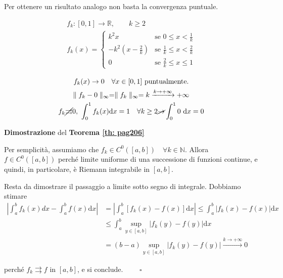 \begin{attbar}
	Per ottenere un risultato analogo non basta la convergenza puntuale.
\end{attbar}

\begin{gather*}
	f_k:[0,1]\rightarrow\mathbb{R}, \qquad k \geq 2
	\\
	f_k(x) = 
	\begin{cases}
		k^2x &\text{se } 0 \leq x < \frac{1}{k}
		\\
		-k^2 \left(x-\frac{2}{k}\right) & \text{se } \frac{1}{k} \leq x < \frac{2}{k}
		\\
		0 & \text{se } \frac{2}{k} \leq x \leq 1
	\end{cases}
\end{gather*}


\begin{gather*} 
	f_k(x) \rightarrow 0 \quad \forall x \in [0,1] \text{ puntualmente.}
	\\
	\parallel f_k-0 \parallel_\infty = \parallel f_k\parallel_\infty=k \xrightarrow{k \rightarrow +\infty} +\infty
	\\
	f_k \cancel{\rightrightarrows} 0, \ \int_{0}^{1} f_k(x) \mathrm{d}x = 1 \quad \forall k \geq 2 \cancel{\rightarrow} \int_{0}^{1} 0 \ \mathrm{d}x = 0
\end{gather*}


\begin{dembar}
	\textbf{Dimostrazione} del \textbf{Teorema \ref{th: pag206}}
	
	Per semplicità, assumiamo che $f_k \in C^0 ([a,b]) \quad \forall k \in \mathbb{N}$. Allora $f\in C^0 ([a,b])$ perché limite uniforme di una successione di funzioni continue, e quindi, in particolare, è Riemann integrabile in $[a,b]$.
	
	Resta da dimostrare il passaggio a limite sotto segno di integrale. Dobbiamo stimare 
	\begin{align*}
		\left| \int_{a}^{b}f_k(x) dx -\int_{a}^{b}f(x) \mathrm{d}x \right|
		&= \left| \int_{a}^{b} [f_k(x)-f(x)] \mathrm{d}x \right| \leq \int_{a}^{b}|f_k(x)-f(x)| \mathrm{d}x
		\\ 
		&\leq \int_{a}^{b}\sup_{y \in [a,b]} |f_k(y)-f(y)| \mathrm{d}x 
		\\
		&= (b-a)\sup_{y \in [a,b]} |f_k(y)-f(y)| \xrightarrow{k \rightarrow+\infty} 0
	\end{align*}
	
	perché $f_k \rightrightarrows f$ in $[a,b]$, e si conclude. $\qquad \square$	
\end{dembar}


